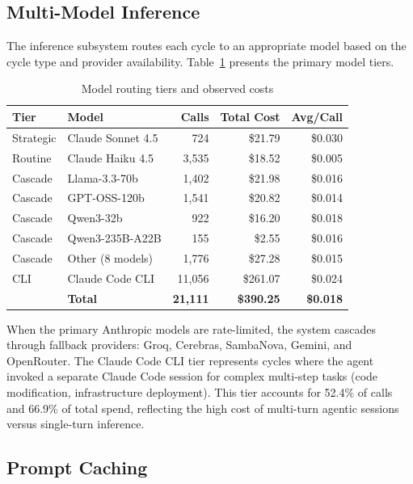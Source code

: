 \documentclass[11pt,a4paper]{article}
\begin{document}
\subsection{Multi-Model Inference}

The inference subsystem routes each cycle to an appropriate model based on the cycle type and provider availability. Table~\ref{tab:model_routing} presents the primary model tiers.

\begin{table}[h]
\centering
\caption{Model routing tiers and observed costs}
\label{tab:model_routing}
\begin{tabular}{@{}llrrr@{}}
\toprule
\textbf{Tier} & \textbf{Model} & \textbf{Calls} & \textbf{Total Cost} & \textbf{Avg/Call} \\
\midrule
Strategic & Claude Sonnet 4.5 & 724 & \$21.79 & \$0.030 \\
Routine & Claude Haiku 4.5 & 3,535 & \$18.52 & \$0.005 \\
Cascade & Llama-3.3-70b & 1,402 & \$21.98 & \$0.016 \\
Cascade & GPT-OSS-120b & 1,541 & \$20.82 & \$0.014 \\
Cascade & Qwen3-32b & 922 & \$16.20 & \$0.018 \\
Cascade & Qwen3-235B-A22B & 155 & \$2.55 & \$0.016 \\
Cascade & Other (8 models) & 1,776 & \$27.28 & \$0.015 \\
CLI & Claude Code CLI & 11,056 & \$261.07 & \$0.024 \\
\midrule
& \textbf{Total} & \textbf{21,111} & \textbf{\$390.25} & \textbf{\$0.018} \\
\bottomrule
\end{tabular}
\end{table}

When the primary Anthropic models are rate-limited, the system cascades through fallback providers: Groq, Cerebras, SambaNova, Gemini, and OpenRouter. The Claude Code CLI tier represents cycles where the agent invoked a separate Claude Code session for complex multi-step tasks (code modification, infrastructure deployment). This tier accounts for 52.4\% of calls and 66.9\% of total spend, reflecting the high cost of multi-turn agentic sessions versus single-turn inference.

\subsection{Prompt Caching}
\end{document}
